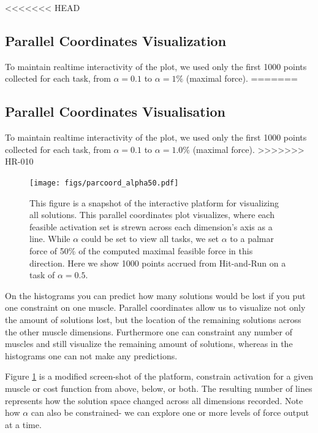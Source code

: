 <<<<<<< HEAD
\subsection{Parallel Coordinates Visualization}
To maintain realtime interactivity of the plot, we used only the first 1000 points collected for each task, from $\alpha = 0.1$ to $\alpha = 1\%$ (maximal force).
=======
\subsection{Parallel Coordinates Visualisation}
To maintain realtime interactivity of the plot, we used only the first 1000 points collected for each task, from $\alpha = 0.1$ to $\alpha = 1.0\%$ (maximal force).
>>>>>>> HR-010

\begin{figure}[htbp]
\centering
\texttt{[image: figs/parcoord\_alpha50.pdf]}
\caption{This figure is a snapshot of the interactive platform for visualizing all solutions. This parallel coordinates plot visualizes, where each feasible activation set is strewn across each dimension's axis as a line. While $\alpha$ could be set to view all tasks, we set $\alpha$ to a palmar force of 50\% of the computed maximal feasible force in this direction. Here we show 1000 points accrued from Hit-and-Run on a task of $\alpha=0.5$.}
\label{fig:parcoord_full}
\end{figure}

On the histograms you can predict how many solutions would be lost if you put one constraint on one muscle. Parallel coordinates allow us to visualize not only the amount of solutions lost, but the location of the remaining solutions across the other muscle dimensions. Furthermore one can constraint any number of muscles and still visualize the remaining amount of solutions, whereas in the histograms one can not make any predictions.

Figure \ref{fig:parcoord_full} is a modified screen-shot of the platform, constrain activation for a given muscle or cost function from above, below, or both. The resulting number of lines represents how the solution space changed across all dimensions recorded.
Note how $\alpha$ can also be constrained- we can explore one or more levels of force output at a time.

